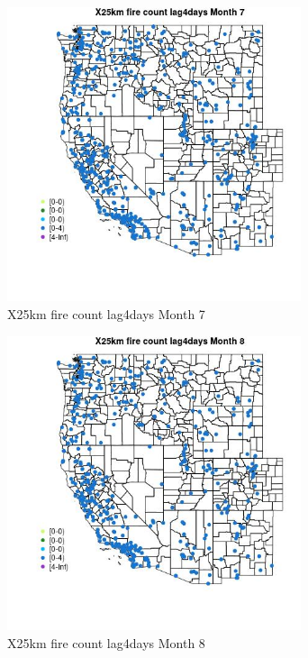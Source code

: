\begin{figure} 
\centering  
\includegraphics[width=0.77\textwidth]{Code_Outputs/Report_ML_input_PM25_Step4_part_e_de_duplicated_aves_compiled_2019-05-14wNAs_MapObsMo7X25km_fire_count_lag4days.jpg} 
\caption{\label{fig:Report_ML_input_PM25_Step4_part_e_de_duplicated_aves_compiled_2019-05-14wNAsMapObsMo7X25km_fire_count_lag4days}X25km fire count lag4days Month 7} 
\end{figure} 
 

\begin{figure} 
\centering  
\includegraphics[width=0.77\textwidth]{Code_Outputs/Report_ML_input_PM25_Step4_part_e_de_duplicated_aves_compiled_2019-05-14wNAs_MapObsMo8X25km_fire_count_lag4days.jpg} 
\caption{\label{fig:Report_ML_input_PM25_Step4_part_e_de_duplicated_aves_compiled_2019-05-14wNAsMapObsMo8X25km_fire_count_lag4days}X25km fire count lag4days Month 8} 
\end{figure} 
 

